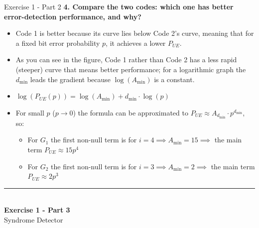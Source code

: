 \documentclass[10pt, aspectratio=169]{beamer}
\newcommand{\question}[1]{{\color{QuestionRed}\textbf{#1}}}
\begin{document}
\begin{frame}{Exercise 1 - Part 2}
	\question{4. Compare the two codes: which one has better error-detection performance, and why?}
	
	\vspace{0.25cm}
	\begin{itemize}
		\item Code 1 is better because its curve lies below Code 2's curve, meaning that for a fixed bit error probability $p$, it achieves a lower $P_{UE}$.
		\item As you can see in the figure, Code 1 rather than Code 2 has a less rapid (steeper) curve that means better performance; for a logarithmic graph the $d_{\min}$ leads the gradient because $\log(A_{\min})$ is a constant.
		\item $\log(P_{UE}(p)) = \log(A_{\min}) + d_{\min} \cdot \log(p)$
		\item For small $p$ ($p \to 0$) the formula can be approximated to $P_{UE} \approx A_{d_{\min}} \cdot p^{d_{\min}}$, so:
		\begin{itemize}
			\item For $G_1$ the first non-null term is for $i = 4 \implies A_{\min} = 15 \implies$ the main term $P_{UE} \approx 15 p^4$
			\item For $G_2$ the first non-null term is for $i = 3 \implies A_{\min} = 2 \implies$ the main term $P_{UE} \approx 2 p^3$
		\end{itemize}
	\end{itemize}
\end{frame}

\begin{frame}[plain]
  \vfill
  \centering
  {\color{TealAccent}\rule{2cm}{2pt}}\\[0.4cm]
  {\LARGE\bfseries\color{NavyPrimary} Exercise 1 - Part 3}\\[0.2cm]
  {\large\color{SlateNeutral} Syndrome Detector}
  \vfill
\end{frame}
\end{document}
